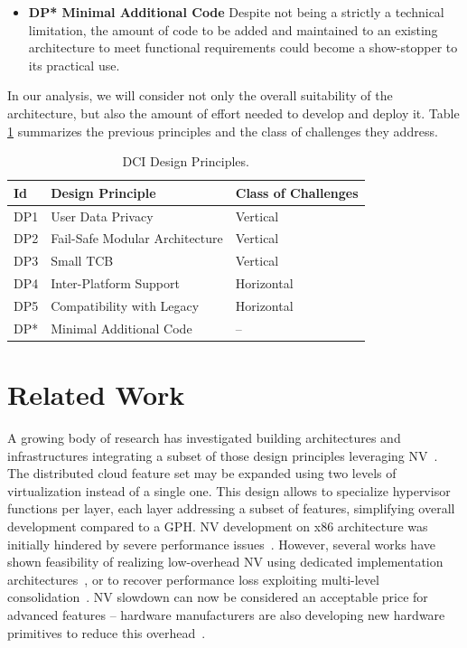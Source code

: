 \documentclass{sig-alternate}
\begin{document}
\begin{itemize}[]
\item \textbf{DP* Minimal Additional Code} Despite not being a strictly a technical limitation, the amount of code to be added and maintained to an existing architecture to meet functional requirements could become a show-stopper to its practical use.
\end{itemize}
In our analysis, we will consider not only the overall suitability of the architecture, but also the amount of effort needed to develop and deploy it. Table \ref{int:des} summarizes the previous principles and the class of challenges they address.
 
\begin{table}
\caption{DCI Design Principles.\label{int:des}}
\begin{tabular}{lll}
\toprule
\textbf{Id} & \textbf{Design Principle} & \textbf{Class of Challenges} \\
\midrule
DP1 & User Data Privacy & Vertical \\
DP2 & Fail-Safe Modular Architecture & Vertical \\ 
DP3 & Small TCB & Vertical \\
DP4 & Inter-Platform Support & Horizontal \\
DP5 & Compatibility with Legacy & Horizontal \\
DP* & Minimal Additional Code & -- \\
\bottomrule
\end{tabular}
\end{table}
 
\section{Related Work}
\label{sec:rw}

\noindent A growing body of research has investigated building architectures and infrastructures integrating a subset of those design principles leveraging NV~\cite{turtle:ibm, hvx:usenix, Inception, art:blan, cloudvisor:zhang}. The distributed cloud feature set may be expanded using two levels of virtualization instead of a single one. This design allows to specialize hypervisor functions per layer, each layer addressing a subset of features, simplifying overall development compared to a GPH. NV development on x86 architecture was initially hindered by severe performance issues~\cite{rec:virt}.
However, several works have shown feasibility of realizing low-overhead NV using dedicated implementation architectures~\cite{turtle:ibm}, or to recover performance loss exploiting multi-level consolidation~\cite{art:blan}. NV slowdown can now be considered an acceptable price for advanced features -- hardware manufacturers are also developing new hardware primitives to reduce this overhead~\cite{vmcs:nakajima}.
\end{document}
